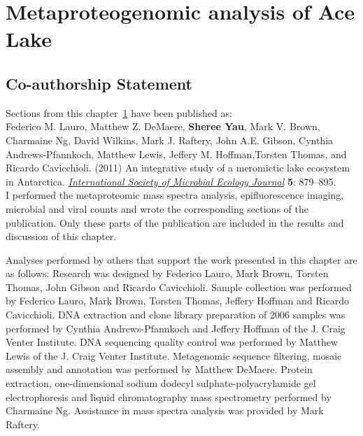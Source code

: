 \chapter{Metaproteogenomic analysis of Ace Lake}
\label{ch:ace}

\section*{Co-authorship Statement}

Sections from this chapter~\ref{ch:ace} have been published as:\\

Federico M. Lauro, Matthew Z. DeMaere, \textbf{Sheree Yau}, Mark V. Brown, Charmaine Ng,
David Wilkins, Mark J. Raftery, John A.E. Gibson, Cynthia Andrews-Pfannkoch, Matthew Lewis,
Jeffery M. Hoffman,Torsten Thomas, and Ricardo Cavicchioli. (2011)
An integrative study of a meromictic lake ecosystem in Antarctica.
\textit{\underline{International Society of Microbial Ecology Journal}}
\textbf{5}: 879--895.\\

I performed the metaproteomic mass spectra analysis, epifluorescence imaging,
microbial and viral counts and wrote the corresponding sections of the publication.
Only these parts of the publication are included in the results and discussion of this chapter.

Analyses performed by others that support the work presented in this chapter are as follows:
Research was designed by Federico Lauro, Mark Brown, Torsten Thomas, John Gibson and Ricardo Cavicchioli.
Sample collection was performed by Federico Lauro, Mark Brown, Torsten Thomas, Jeffery Hoffman and Ricardo Cavicchioli.
DNA extraction and clone library preparation of 2006 samples was performed by Cynthia Andrews-Pfannkoch and Jeffery Hoffman of the J. Craig Venter Institute.
DNA sequencing quality control was performed by Matthew Lewis of the J. Craig Venter Institute.
Metagenomic sequence filtering, mosaic assembly and annotation was performed by Matthew DeMaere.
Protein extraction, one-dimensional sodium dodecyl sulphate-polyacrylamide gel electrophoresis and liquid chromatography mass spectrometry performed by Charmaine Ng.
Assistance in mass spectra analysis was provided by Mark Raftery.
\newpage


